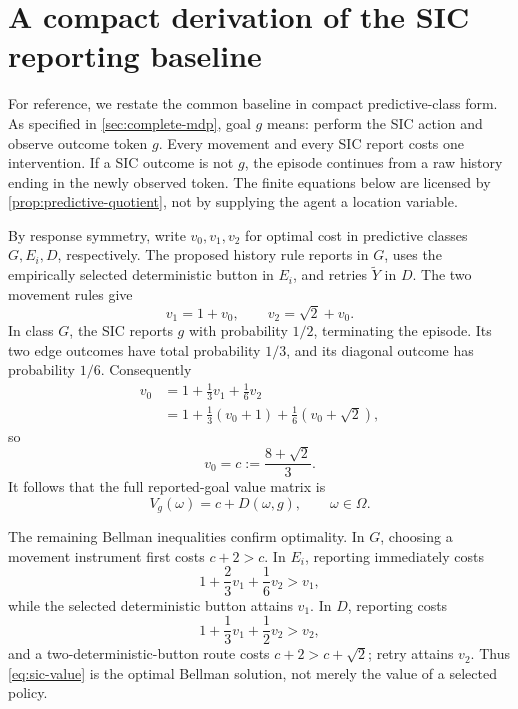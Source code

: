 \documentclass[11pt]{article}
\theoremstyle{definition}
\theoremstyle{remark}
\begin{document}
\section{A compact derivation of the SIC reporting baseline}
\label{sec:reported-goal}

For reference, we restate the common baseline in compact predictive-class
form. As specified in \cref{sec:complete-mdp}, goal \(g\) means: perform the
SIC action and observe outcome token \(g\). Every movement and every SIC report
costs one intervention. If a SIC outcome is not \(g\), the episode continues
from a raw history ending in the newly observed token.  The finite equations
below are licensed by \cref{prop:predictive-quotient}, not by supplying the
agent a location variable.

By response symmetry, write \(v_0,v_1,v_2\) for optimal cost in predictive
classes \(G,E_i,D\), respectively.  The proposed history rule reports in
\(G\), uses the empirically selected deterministic button in \(E_i\), and
retries \(\widetilde Y\) in \(D\).
The two movement rules give
\begin{equation}
 v_1=1+v_0,
 \qquad
 v_2=\sqrt2+v_0.
 \label{eq:sic-shell-moves}
\end{equation}
In class \(G\), the SIC reports \(g\) with probability \(1/2\), terminating
the episode. Its two edge outcomes have total probability \(1/3\), and its
diagonal outcome has probability \(1/6\). Consequently
\begin{align}
 v_0
 &=1+\frac13v_1+\frac16v_2\\
 &=1+\frac13(v_0+1)+\frac16(v_0+\sqrt2),
\end{align}
so
\begin{equation}
 \boxed{v_0=c:=\frac{8+\sqrt2}{3}}.
 \label{eq:sic-baseline}
\end{equation}
It follows that the full reported-goal value matrix is
\begin{equation}
 \boxed{V_g(\omega)=c+D(\omega,g),\qquad \omega\in\Omega.}
 \label{eq:sic-value}
\end{equation}

The remaining Bellman inequalities confirm optimality. In \(G\), choosing a
movement instrument first costs \(c+2>c\). In \(E_i\), reporting immediately costs
\[
 1+\frac23v_1+\frac16v_2>v_1,
\]
while the selected deterministic button attains \(v_1\). In \(D\), reporting costs
\[
 1+\frac13v_1+\frac12v_2>v_2,
\]
and a two-deterministic-button route costs \(c+2>c+\sqrt2\); retry attains
\(v_2\). Thus \eqref{eq:sic-value} is the optimal Bellman solution, not merely
the value of a selected policy.
\end{document}
